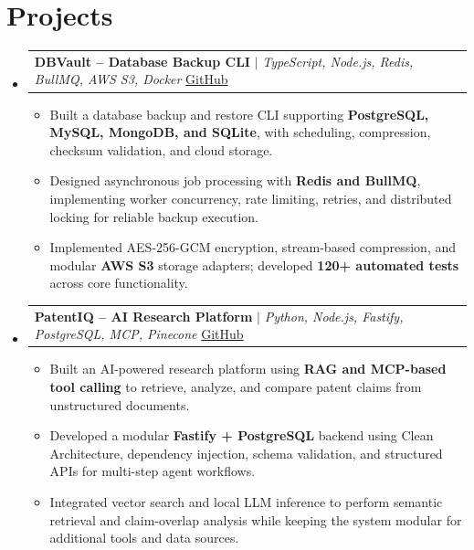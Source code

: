 \documentclass[letterpaper,10pt]{article}
\makeatletter
\newcommand{\resumeItem}[1]{
  \item\small{#1\vspace{-1pt}}
}
\newcommand{\resumeProjectHeading}[2]{
  \item
  \begin{tabular*}{0.97\textwidth}[t]{l@{\extracolsep{\fill}}r}
    \small#1 & #2 \\
  \end{tabular*}
  \vspace{1pt}
}
\newcommand{\resumeSubHeadingListStart}{
\begin{itemize}[
    leftmargin=0.15in,
    label={},
    itemsep=1.5pt,
    parsep=0pt,
    topsep=1.5pt,
    partopsep=0pt
]
}
\newcommand{\resumeSubHeadingListEnd}{
\end{itemize}
\vspace{-3pt}
}
\newcommand{\resumeItemListStart}{
\begin{itemize}[
    itemsep=0.6pt,
    parsep=0pt,
    topsep=1pt,
    partopsep=0pt,
    leftmargin=0.18in
]
}
\newcommand{\resumeItemListEnd}{
\end{itemize}
\vspace{-2pt}
}
\makeatother
\begin{document}
\section{Projects}

\resumeSubHeadingListStart

\resumeProjectHeading
{\textbf{DBVault -- Database Backup CLI} $|$ \emph{TypeScript, Node.js, Redis, BullMQ, AWS S3, Docker}
\hfill
\href{https://github.com/rithishcodespace/db-backup-cli}{GitHub}}{}

\resumeItemListStart

    \resumeItem{Built a database backup and restore CLI supporting \textbf{PostgreSQL, MySQL, MongoDB, and SQLite}, with scheduling, compression, checksum validation, and cloud storage.}

    \resumeItem{Designed asynchronous job processing with \textbf{Redis and BullMQ}, implementing worker concurrency, rate limiting, retries, and distributed locking for reliable backup execution.}

    \resumeItem{Implemented AES-256-GCM encryption, stream-based compression, and modular \textbf{AWS S3} storage adapters; developed \textbf{120+ automated tests} across core functionality.}

\resumeItemListEnd

\resumeProjectHeading
{\textbf{PatentIQ -- AI Research Platform} $|$ \emph{Python, Node.js, Fastify, PostgreSQL, MCP, Pinecone}
\hfill
\href{https://github.com/rithishcodespace/PatentIQ}{GitHub}}{}

\resumeItemListStart

    \resumeItem{Built an AI-powered research platform using \textbf{RAG and MCP-based tool calling} to retrieve, analyze, and compare patent claims from unstructured documents.}

    \resumeItem{Developed a modular \textbf{Fastify + PostgreSQL} backend using Clean Architecture, dependency injection, schema validation, and structured APIs for multi-step agent workflows.}

    \resumeItem{Integrated vector search and local LLM inference to perform semantic retrieval and claim-overlap analysis while keeping the system modular for additional tools and data sources.}

\resumeItemListEnd

\resumeSubHeadingListEnd

\end{document}
